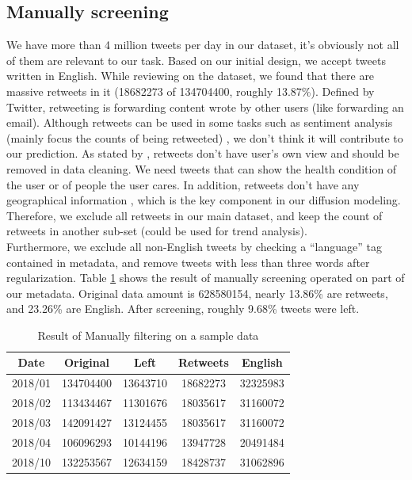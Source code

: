 \subsection{Manually screening}
\label{sec:Manually screening}
We have more than 4 million tweets per day in our dataset, it's obviously not all of them are relevant to our task. Based on our initial design, we accept tweets written in English. While reviewing on the dataset, we found that there are massive retweets in it (18682273 of 134704400, roughly 13.87\%). Defined by Twitter\cite{twitter_dev}, retweeting is forwarding content wrote by other users (like forwarding an email). Although retweets can be used in some tasks such as sentiment analysis (mainly focus the counts of being retweeted) \cite{perdana2018combining}, we don't think it will contribute to our prediction. As stated by \cite{kim2016competitive}, retweets don't have user's own view and should be removed in data cleaning. We need tweets that can show the health condition of the user or of people the user cares. In addition, retweets don't have any geographical information \cite{twitter_dev}, which is the key component in our diffusion modeling. Therefore, we exclude all retweets in our main dataset, and keep the count of retweets in another sub-set (could be used for trend analysis).\\ Furthermore, we exclude all non-English tweets by checking a ``language'' tag contained in metadata, and remove tweets with less than three words after regularization. Table \ref{tab:manual} shows the result of manually screening operated on part of our metadata. Original data amount is 628580154, nearly 13.86\% are retweets, and 23.26\% are English. After screening, roughly 9.68\% tweets were left.
\begin{table}[!htbp]
    \centering
    \hspace{0.5cm}
    \begin{tabular}{ccccc}
        Date & Original & Left & Retweets & English\\ \hline
        2018/01 &134704400 & 13643710 & 18682273 & 32325983 \\ \hline
        2018/02 &113434467 & 11301676 & 18035617 & 31160072 \\ \hline
        2018/03 & 142091427 & 13124455 & 18035617 & 31160072 \\ \hline
        2018/04 & 106096293 & 10144196 & 13947728 & 20491484 \\ \hline
        2018/10 & 132253567 & 12634159 & 18428737 & 31062896 \\\hline
    \end{tabular}
    \caption{Result of Manually filtering on a sample data}
    \label{tab:manual}
\end{table}
